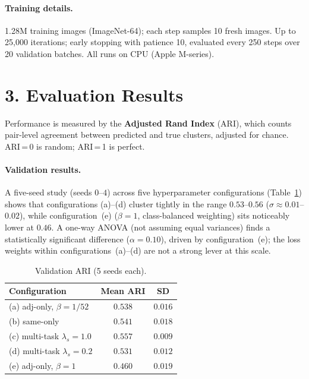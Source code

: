 \documentclass[10pt, a4paper, twocolumn]{article}
\begin{document}
\paragraph{Training details.}
1.28M training images (ImageNet-64); each step samples 10 fresh images.
Up to 25{,}000 iterations; early stopping with patience 10, evaluated every
250 steps over 20 validation batches. All runs on CPU (Apple M-series).

\section*{3. Evaluation Results}

Performance is measured by the \textbf{Adjusted Rand Index} (ARI), which
counts pair-level agreement between predicted and true clusters, adjusted for
chance. ARI\,=\,0 is random; ARI\,=\,1 is perfect.

\paragraph{Validation results.}
A five-seed study (seeds $0$--$4$) across five hyperparameter configurations
(Table~\ref{tab:results}) shows that configurations (a)--(d) cluster tightly in
the range $0.53$--$0.56$ ($\sigma\approx0.01$--$0.02$), while configuration~(e)
($\beta=1$, class-balanced weighting) sits noticeably lower at $0.46$.
A one-way ANOVA (not assuming equal variances) finds a statistically significant difference
($\alpha=0.10$), driven by configuration~(e); the loss weights within
configurations~(a)--(d) are not a strong lever at this scale.

\begin{table}[h]
\centering\small
\begin{tabular}{lcc}
\toprule
\textbf{Configuration} & \textbf{Mean ARI} & \textbf{SD} \\
\midrule
(a) adj-only, $\beta=1/52$     & $0.538$ & $0.016$ \\
(b) same-only                  & $0.541$ & $0.018$ \\
(c) multi-task $\lambda_s=1.0$ & $0.557$ & $0.009$ \\
(d) multi-task $\lambda_s=0.2$ & $0.531$ & $0.012$ \\
(e) adj-only, $\beta=1$        & $0.460$ & $0.019$ \\
\bottomrule
\end{tabular}
\caption{Validation ARI (5 seeds each).}
\label{tab:results}
\end{table}
\end{document}
